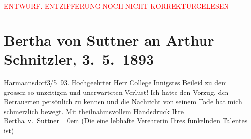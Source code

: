 
\begin{center}
            \textcolor{red}{ENTWURF. ENTZIFFERUNG NOCH NICHT KORREKTURGELESEN}
                      \end{center}
            
               \section[Bertha von Suttner an Arthur Schnitzler, 3. 5. 1893]{ Bertha von Suttner an Arthur Schnitzler, 3. 5. 1893}\nopagebreak{}\rehead{ }\begin{ledgroupsized}[t]{13cm}\normalsize\beginnumbering{} \toendnotes[C]{\smallbreak\pagebreak[2]} 
\toendnotes[C]{\smallbreak}\pstart
           \noindent{}{\pb}\textcolor{gray}{\textbf{\label{T_L00210-1v}\label{T_L00210-1h}}}\hfill Harmannsdorf3/5 93.\pend
           \pstart{}Hochgeehrter Herr College\pend\pstart
           Innigstes Beileid zu dem grossen so unzeitigen und unerwarteten Verlust! Ich
                    hatte den Vorzug, den Betrauerten persönlich zu kennen und die Nachricht von seinem Tode hat
                    mich schmerzlich bewegt. Mit theilnahms{\pb}vollem Händedruck\pend
           \pstart
           Ihre{\\[\baselineskip]}\spacefill\mbox{Bertha v. Suttner}\pend
           \leftskip=0em{}\pstart
           \noindent{}(Die eine lebhafte Verehrerin Ihres funkelnden Talentes ist)\pend
           \endnumbering{}\end{ledgroupsized}  \newcommand{\dateiname}{L00210}\newcommand{\titel}{Bertha von Suttner an Arthur Schnitzler, 3. 5. 1893}\newcommand{\editorInnen}{Martin Anton Müller und Gerd-Hermann Susen}
      